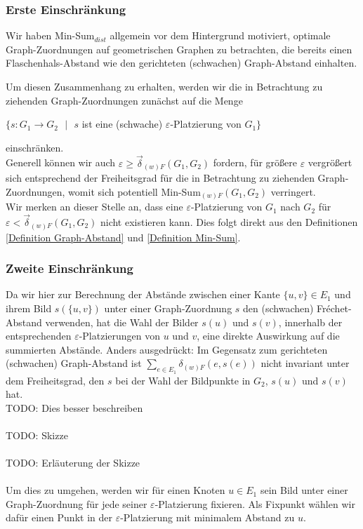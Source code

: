 \documentclass[a4paper, 12pt, twoside]{article}
\theoremstyle{Format1} %
\begin{document}
\subsubsection{Erste Einschränkung} \label{Erste Einschränkung}

Wir haben Min-Sum$_{dist}$ allgemein vor dem Hintergrund motiviert, optimale Graph-Zuordnungen auf geometrischen Graphen zu betrachten,
die bereits einen Flaschenhals-Abstand wie den gerichteten (schwachen) Graph-Abstand einhalten.

Um diesen Zusammenhang zu erhalten, werden wir die in Betrachtung zu ziehenden Graph-Zuordnungen zunächst auf die Menge
\begin{center}
	$\{s: G_1 \to G_2 \text{ $|$ } s$ ist eine (schwache) $\varepsilon$-Platzierung von $G_1 \}$
\end{center}
einschränken.
\\
Generell können wir auch $\varepsilon \geq \vec{\delta}_{(w)F}(G_1, G_2)$ fordern, für größere $\varepsilon$ vergrößert sich entsprechend der Freiheitsgrad für die
in Betrachtung zu ziehenden Graph-Zuordnungen, womit sich potentiell Min-Sum$_{(w)F}(G_1, G_2)$ verringert.
\\
Wir merken an dieser Stelle an, dass eine $\varepsilon$-Platzierung von $G_1$ nach $G_2$ für $\varepsilon < \vec{\delta}_{(w)F}(G_1,G_2)$
nicht existieren kann. Dies folgt direkt aus den Definitionen \ref{Definition Graph-Abstand} und \ref{Definition Min-Sum}.

\subsubsection{Zweite Einschränkung} \label {Zweite Einschränkung}
Da wir hier zur Berechnung der Abstände zwischen einer Kante $\{u,v\} \in E_1$ und ihrem Bild $s(\{u,v\})$ unter einer Graph-Zuordnung $s$ den (schwachen) Fréchet-Abstand verwenden,
hat die Wahl der Bilder $s(u)$ und $s(v)$, innerhalb der entsprechenden $\varepsilon$-Platzierungen von $u$ und $v$, eine direkte Auswirkung auf die summierten Abstände.
Anders ausgedrückt: Im Gegensatz zum gerichteten (schwachen) Graph-Abstand ist $\sum_{e \in E_1}\delta_{(w)F}(e, s(e))$ nicht invariant unter dem Freiheitsgrad, den $s$
bei der Wahl der Bildpunkte in $G_2$, $s(u)$ und $s(v)$ hat.
\\
TODO: Dies besser beschreiben
\\
\\
TODO: Skizze
\\
\\
TODO: Erläuterung der Skizze
\\
\\
Um dies zu umgehen, werden wir für einen Knoten $u \in E_1$ sein Bild unter einer Graph-Zuordnung für jede seiner $\varepsilon$-Platzierung fixieren.
Als Fixpunkt wählen wir dafür einen Punkt in der $\varepsilon$-Platzierung mit minimalem Abstand zu $u$.
\end{document}
